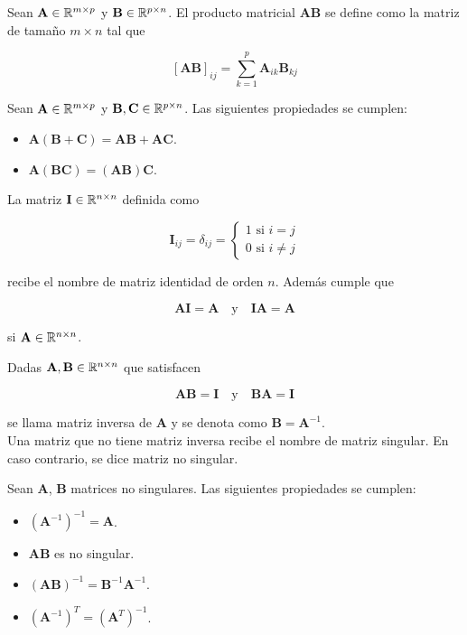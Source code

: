 \begin{defi}
Sean $\mathbf{A} \in \mathbb{R}^{m \times p}$ y $\mathbf{B} \in \mathbb{R}^{p \times n}$. El producto matricial $\mathbf{A}\mathbf{B}$ se define como la matriz de tamaño $m \times n$ tal que

\[ [\mathbf{A}\mathbf{B}]_{ij} = \sum_{k=1}^{p} \mathbf{A}_{ik}\mathbf{B}_{kj} \] 
\end{defi}

\begin{defi}
Sean $\mathbf{A} \in \mathbb{R}^{m \times p}$ y $\mathbf{B}, \mathbf{C} \in \mathbb{R}^{p \times n}$. Las siguientes propiedades se cumplen:

\begin{itemize}
\item $\mathbf{A}(\mathbf{B} + \mathbf{C}) = \mathbf{A}\mathbf{B} + \mathbf{A}\mathbf{C}$.
\item $\mathbf{A}(\mathbf{B} \mathbf{C}) = (\mathbf{A}\mathbf{B})\mathbf{C}$.
\end{itemize}
\end{defi}

\begin{defi}
La matriz $\mathbf{I} \in \mathbb{R}^{n \times n}$ definida como 

\[ \mathbf{I}_{ij} = \delta_{ij} = \begin{cases}
1 \text{ si } i = j\\
0 \text{ si } i \neq j
\end{cases} \]

recibe el nombre de matriz identidad de orden $n$. Además cumple que 

\[\mathbf{A} \mathbf{I} = \mathbf{A}\quad \text{y} \quad \mathbf{I} \mathbf{A} = \mathbf{A}\]

si $\mathbf{A} \in \mathbb{R}^{n \times n}$.
\end{defi}

\begin{defi}
Dadas $\mathbf{A}, \mathbf{B} \in \mathbb{R}^{n \times n}$ que satisfacen 

\[ \mathbf{A} \mathbf{B} = \mathbf{I} \quad \text{y} \quad \mathbf{B} \mathbf{A} = \mathbf{I} \]

se llama matriz inversa de $\mathbf{A}$ y se denota como $\mathbf{B} = \mathbf{A}^{-1}$.\\

Una matriz que no tiene matriz inversa recibe el nombre de matriz singular. En caso contrario, se dice matriz no singular. 
\end{defi}

\begin{defi}
Sean $\mathbf{A}$, $\mathbf{B}$ matrices no singulares. Las siguientes propiedades se cumplen:

\begin{itemize}
\item $(\mathbf{A}^{-1})^{-1} = \mathbf{A}$.
\item $\mathbf{A} \mathbf{B}$ es no singular.
\item $(\mathbf{A} \mathbf{B})^{-1} = \mathbf{B}^{-1} \mathbf{A}^{-1}$.
\item $(\mathbf{A}^{-1})^T = (\mathbf{A}^T)^{-1}$.
\end{itemize}
\end{defi}


